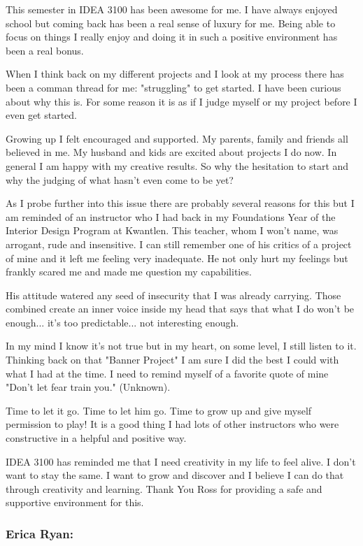 \documentclass[letterpaper,10pt,headsepline]{scrreprt}
\begin{document}
This semester in IDEA 3100 has been awesome for me. I have always 
enjoyed school but coming back has been a real sense of luxury for 
me. Being able to focus on things I really enjoy and doing it in such a 
positive environment has been a real bonus. 

When I think back on my different projects and I look at my process there 
has been a comman thread for me: "struggling" to get started. I have been 
curious about why this is. For some reason it is as if I judge myself or my 
project before I even get started. 

Growing up I felt encouraged and supported. My parents, family and 
friends all believed in me. My husband and kids are excited about 
projects I do now. In general I am happy with my creative results. So 
why the hesitation to start and why the judging of what hasn't even come 
to be yet?

As I probe further into this issue there are probably several reasons for 
this but I am reminded of an instructor who I had back in my Foundations 
Year of the Interior Design Program at Kwantlen. This teacher, whom I 
won't name, was arrogant, rude and insensitive. I can still remember 
one of his critics of a project of mine and it left me feeling very 
inadequate. He not only hurt my feelings but frankly scared me and 
made me question my capabilities. 

His attitude watered any seed of insecurity that I was already carrying. 
Those combined create an inner voice inside my head that says 
that what I do won't be enough... it's too predictable... not interesting 
enough. 

In my mind I know it's not true but in my heart, on some level, I still listen 
to it. Thinking back on that "Banner Project" I am sure I did the 
best I could with what I had at the time. I need to remind myself of a 
favorite quote of mine "Don't let fear train you." (Unknown).

Time to let it go. Time to let him go. Time to grow up and give myself 
permission to play! It is a good thing I had lots of other instructors who 
were constructive in a helpful and positive way. 

IDEA 3100 has reminded me that I need creativity in my life to feel alive.
I don't want to stay the same. I want to grow and discover and I believe I 
can do that through creativity and learning. Thank You Ross for providing 
a safe and supportive environment for this.

\subsubsection{Erica Ryan:}
\end{document}

